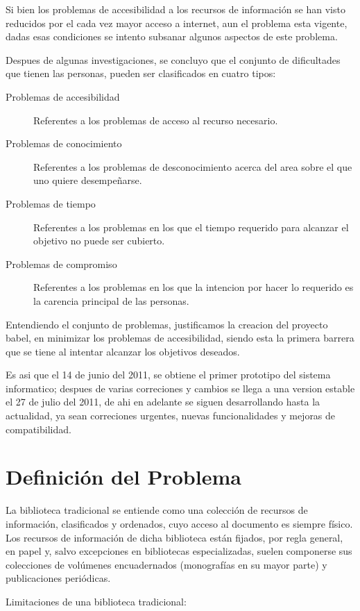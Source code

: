 \documentclass[letter,12pt]{article}
\begin{document}
Si bien los problemas de accesibilidad a los recursos de información se han visto reducidos por
el cada vez mayor acceso a internet, aun el problema esta vigente, dadas esas condiciones se
intento subsanar algunos aspectos de este problema.

Despues de algunas investigaciones, se concluyo que el conjunto de dificultades que tienen las
personas, pueden ser clasificados en cuatro tipos:

\begin{description}
\item [Problemas de accesibilidad] Referentes a los problemas de acceso al recurso necesario.
\item [Problemas de conocimiento] Referentes a los problemas de desconocimiento acerca del area
sobre el que uno quiere desempeñarse.
\item [Problemas de tiempo] Referentes a los problemas en los que el tiempo requerido para
alcanzar el objetivo no puede ser cubierto.
\item [Problemas de compromiso] Referentes a los problemas en los que la intencion por hacer lo
requerido es la carencia principal de las personas.
\end{description}

Entendiendo el conjunto de problemas, justificamos la creacion del proyecto babel, en minimizar
los problemas de accesibilidad, siendo esta la primera barrera que se tiene al intentar alcanzar
los objetivos deseados.

Es asi que el 14 de junio del 2011, se obtiene el primer prototipo del sistema informatico; 
despues de varias correciones y cambios se llega a una version estable el 27 de julio del 2011,
de ahi en adelante se siguen desarrollando hasta la actualidad, ya sean correciones urgentes,
nuevas funcionalidades y mejoras de compatibilidad.

\section{Definición del Problema}
La biblioteca tradicional se entiende como una colección de recursos de información, clasificados
y ordenados, cuyo acceso al documento es siempre físico. Los recursos de información de dicha
biblioteca están fijados, por regla general, en papel y, salvo excepciones en bibliotecas
especializadas, suelen componerse sus colecciones de volúmenes encuadernados (monografías en su
mayor parte) y publicaciones periódicas.

Limitaciones de una biblioteca tradicional:
\end{document}

